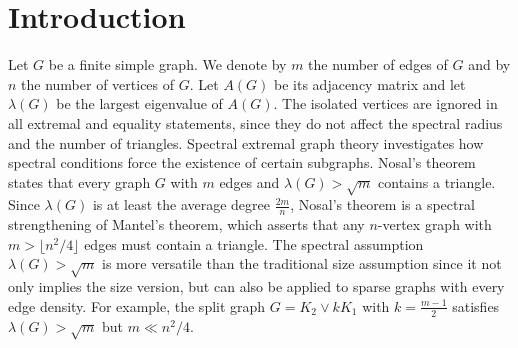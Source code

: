 \documentclass[11pt,a4paper]{article}
\theoremstyle{definition}
\theoremstyle{plain}
\renewcommand{\ge}{\geqslant}
\begin{document}
\begin{abstract}
\begin{itemize}
    \item Every $m$-edge Nosal graph $G$ contains at least 
    $\bigl(\tfrac{1}{8} - o(1)\bigr) m$ copies of the kite $C_4^+=B_2$, and the constant 
    $\tfrac18$ is best possible. 
    This determines the sharp asymptotic constant for counting $C_4^+$ and strengthens the $\Omega(m)$ bound of Li, Liu and Zhang.
\end{itemize} 
The proofs for triangles are based on a third-moment count that controls $\sum_{i \ge 2} \lambda_i^3$ through the Cauchy interlacing theorem and the power-mean monotonicity. 
The proofs for books are based on a unified framework: a Perron-vector decomposition around a 
vertex of maximum coordinate, an exact identity for the spectral surplus 
$\lambda^2 - m$, and a half-missing-weights estimate. 
\end{abstract}




\section{Introduction}

Let $G$ be a finite simple graph. We denote by $m$ the number of edges of $G$ and by $n$ the number of vertices of $G$. 
Let $A(G)$ be its adjacency matrix and let $\lambda(G)$ be the largest eigenvalue of $A(G)$. 
The isolated vertices are ignored in all extremal and equality statements, since they do not affect the spectral radius and the number of triangles. 
Spectral extremal graph theory investigates how spectral conditions force the existence of certain subgraphs. 
Nosal's theorem \cite{Nosal1970} states that every graph $G$ with $m$ edges and $\lambda(G) > \sqrt{m}$ contains a triangle. 
Since $\lambda (G)$ is at least the average degree $\frac{2m}{n}$, 
Nosal's theorem is a spectral strengthening of Mantel's theorem, which asserts that any $n$-vertex graph with $m > \lfloor n^2/4 \rfloor$ edges must contain a triangle. 
The spectral assumption $\lambda (G)> \sqrt{m}$ is more versatile than the traditional size assumption 
since it not only implies the size version, but can also be applied to sparse graphs with every edge density. For example, the split graph $G=K_2\vee kK_1$ with $k=\frac{m-1}{2}$ satisfies $\lambda (G) > \sqrt{m}$ but $m\ll n^2/4$. 
\end{document}
